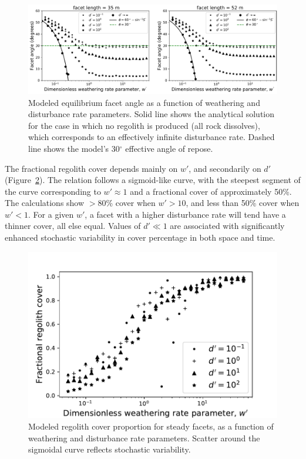 \begin{figure}[ht!]
\centerline{\includegraphics[scale=0.8]{Figures/facet_angle_vs_dw.pdf}}
\caption{Modeled equilibrium facet angle as a function of weathering and disturbance rate parameters. Solid line shows the analytical solution for the case in which no regolith is produced (all rock dissolves), which corresponds to an effectively infinite disturbance rate. Dashed line shows the model's 30$^\circ$ effective angle of repose.}
\label{fig:angw}
\end{figure}

The fractional regolith cover depends mainly on $w'$, and secondarily on $d'$ (Figure~\ref{fig:regw}). The relation follows a sigmoid-like curve, with the steepest segment of the curve corresponding to $w'\approx 1$ and a fractional cover of approximately 50\%. The calculations show $>$80\% cover when $w'>10$, and less than 50\% cover when $w'<1$. For a given $w'$, a facet with a higher disturbance rate will tend have a thinner cover, all else equal. Values of $d'\ll1$ are associated with significantly enhanced stochastic variability in cover percentage in both space and time.

\begin{figure}[ht!]
\centerline{\includegraphics{Figures/reg_cover_vs_wprime.pdf}}
\caption{Modeled regolith cover proportion for steady facets, as a function of weathering and disturbance rate parameters. Scatter around the sigmoidal curve reflects stochastic variability.}
\label{fig:regw}
\end{figure}


